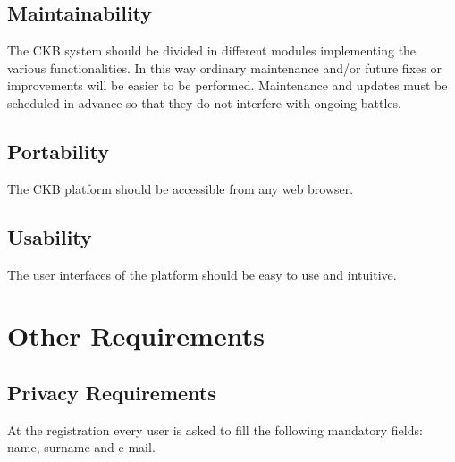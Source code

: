 \subsection{Maintainability}
The CKB system should be divided in different modules implementing the various functionalities. In this way ordinary maintenance and/or future fixes or improvements will be easier to be performed. \newline
Maintenance and updates must be scheduled in advance so that they do not interfere with ongoing battles. 
\subsection{Portability}
The CKB platform should be accessible from any web browser.
\subsection{Usability}
The user interfaces of the platform should be easy to use and intuitive.

\section{Other Requirements}
\subsection{Privacy Requirements}
At the registration every user is asked to fill the following mandatory fields:
name, surname and e-mail. 
